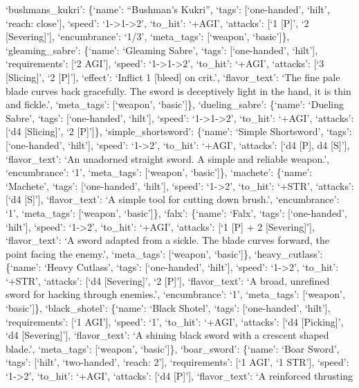 \documentclass[
  letterpaper,
  DIV=11,
  numbers=noendperiod]{scrartcl}
\begin{document}
`bushmans\_kukri': \{`name': ``Bushman's Kukri'', `tags':
{[}`one-handed', `hilt', `reach: close'{]}, `speed':
`1-\textgreater1-\textgreater2', `to\_hit': `+AGI', `attacks': {[}`1
{[}P{]}', `2 {[}Severing{]}'{]}, `encumbrance': `1/3', `meta\_tags':
{[}`weapon', `basic'{]}\}, `gleaming\_sabre': \{`name': `Gleaming
Sabre', `tags': {[}`one-handed', `hilt'{]}, `requirements': {[}`2
AGI'{]}, `speed': `1-\textgreater1-\textgreater2', `to\_hit': `+AGI',
`attacks': {[}`3 {[}Slicing{]}', `2 {[}P{]}'{]}, `effect': `Inflict 1
{[}bleed{]} on crit.', `flavor\_text': `The fine pale blade curves back
gracefully. The sword is deceptively light in the hand, it is thin and
fickle.', `meta\_tags': {[}`weapon', `basic'{]}\}, `dueling\_sabre':
\{`name': `Dueling Sabre', `tags': {[}`one-handed', `hilt'{]}, `speed':
`1-\textgreater1-\textgreater2', `to\_hit': `+AGI', `attacks': {[}`d4
{[}Slicing{]}', `2 {[}P{]}'{]}\}, `simple\_shortsword': \{`name':
`Simple Shortsword', `tags': {[}`one-handed', `hilt'{]}, `speed':
`1-\textgreater2', `to\_hit': `+AGI', `attacks': {[}`d4 {[}P{]}, d4
{[}S{]}'{]}, `flavor\_text': `An unadorned straight sword. A simple and
reliable weapon.', `encumbrance': `1', `meta\_tags': {[}`weapon',
`basic'{]}\}, `machete': \{`name': `Machete', `tags': {[}`one-handed',
`hilt'{]}, `speed': `1-\textgreater2', `to\_hit': `+STR', `attacks':
{[}`d4 {[}S{]}'{]}, `flavor\_text': `A simple tool for cutting down
brush.', `encumbrance': `1', `meta\_tags': {[}`weapon', `basic'{]}\},
`falx': \{`name': `Falx', `tags': {[}`one-handed', `hilt'{]}, `speed':
`1-\textgreater2', `to\_hit': `+AGI', `attacks': {[}`1 {[}P{]} + 2
{[}Severing{]}'{]}, `flavor\_text': `A sword adapted from a sickle. The
blade curves forward, the point facing the enemy.', `meta\_tags':
{[}`weapon', `basic'{]}\}, `heavy\_cutlass': \{`name': `Heavy Cutlass',
`tags': {[}`one-handed', `hilt'{]}, `speed': `1-\textgreater2',
`to\_hit': `+STR', `attacks': {[}`d4 {[}Severing{]}', `2 {[}P{]}'{]},
`flavor\_text': `A broad, unrefined sword for hacking through enemies.',
`encumbrance': `1', `meta\_tags': {[}`weapon', `basic'{]}\},
`black\_shotel': \{`name': `Black Shotel', `tags': {[}`one-handed',
`hilt'{]}, `requirements': {[}`1 AGI'{]}, `speed': `1', `to\_hit':
`+AGI', `attacks': {[}`d4 {[}Picking{]}', `d4 {[}Severing{]}'{]},
`flavor\_text': `A shining black sword with a crescent shaped blade.',
`meta\_tags': {[}`weapon', `basic'{]}\}, `boar\_sword': \{`name': `Boar
Sword', `tags': {[}`hilt', `two-handed', `reach: 2'{]}, `requirements':
{[}`1 AGI', `1 STR'{]}, `speed': `1-\textgreater2', `to\_hit': `+AGI',
`attacks': {[}`d4 {[}P{]}'{]}, `flavor\_text': `A reinforced thrusting
\end{document}
